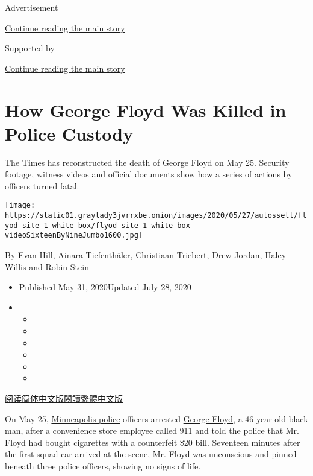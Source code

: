 Advertisement

\protect\hyperlink{after-top}{Continue reading the main story}

Supported by

\protect\hyperlink{after-sponsor}{Continue reading the main story}

\hypertarget{how-george-floyd-was-killed-in-police-custody}{%
\section{How George Floyd Was Killed in Police
Custody}\label{how-george-floyd-was-killed-in-police-custody}}

The Times has reconstructed the death of George Floyd on May 25.
Security footage, witness videos and official documents show how a
series of actions by officers turned fatal.

\texttt{[image: https://static01.graylady3jvrrxbe.onion/images/2020/05/27/autossell/flyod-site-1-white-box/flyod-site-1-white-box-videoSixteenByNineJumbo1600.jpg]}

By \href{https://www.nytimes3xbfgragh.onion/by/evan-hill}{Evan Hill},
\href{https://www.nytimes3xbfgragh.onion/by/ainara-tiefenthaler}{Ainara
Tiefenthäler},
\href{http://nytimes3xbfgragh.onion/by/christiaan-triebert}{Christiaan
Triebert}, \href{https://www.nytimes3xbfgragh.onion/by/drew-jordan}{Drew
Jordan}, \href{https://www.nytimes3xbfgragh.onion/by/haley-willis}{Haley
Willis} and Robin Stein

\begin{itemize}
\item
  Published May 31, 2020Updated July 28, 2020
\item
  \begin{itemize}
  \item
  \item
  \item
  \item
  \item
  \item
  \end{itemize}
\end{itemize}

\href{https://cn.nytimes3xbfgragh.onion/usa/20200602/george-floyd-investigation/}{阅读简体中文版}\href{https://cn.nytimes3xbfgragh.onion/usa/20200602/george-floyd-investigation/zh-hant}{閱讀繁體中文版}

On May 25,
\href{https://www.nytimes3xbfgragh.onion/2020/07/28/us/umbrella-man-identified-minneapolis.html}{Minneapolis
police} officers arrested
\href{https://www.nytimes3xbfgragh.onion/2020/07/28/us/umbrella-man-identified-minneapolis.html}{George
Floyd}, a 46-year-old black man, after a convenience store employee
called 911 and told the police that Mr. Floyd had bought cigarettes with
a counterfeit \$20 bill. Seventeen minutes after the first squad car
arrived at the scene, Mr. Floyd was unconscious and pinned beneath three
police officers, showing no signs of life.

